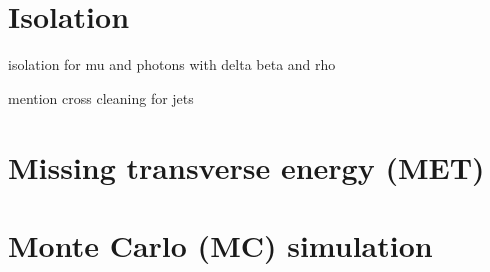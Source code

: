 \section{Isolation}

isolation for mu and photons with delta beta and rho

mention cross cleaning for jets

\section{Missing transverse energy (MET)}
\label{sec:met_reco}

\section{Monte Carlo (MC) simulation}
\label{sec:mc_reco}

